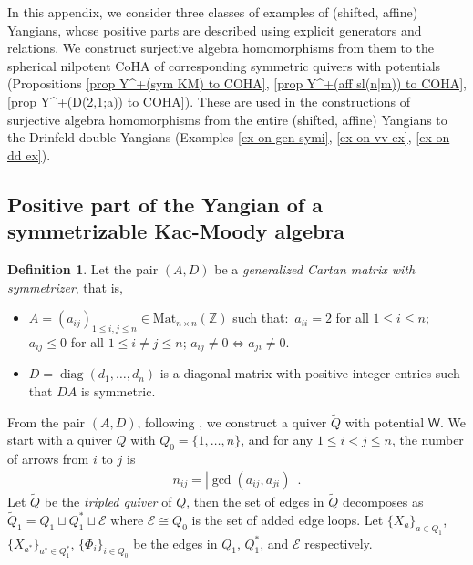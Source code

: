 \documentclass[10pt]{amsart}
\theoremstyle{definition}
\newtheorem{Definition}[Theorem]{Definition}
\numberwithin{equation}{section}
\newcommand{\bZ}{\mathbb{Z}}
\newcommand{\sW}{\mathsf{W}}
\newcommand{\diag}{\operatorname{diag}}
\begin{document}
In this appendix, we consider three classes of examples of (shifted, affine) Yangians, 
whose positive parts are described using explicit generators and relations.  
We construct surjective algebra homomorphisms from them to the 
spherical nilpotent CoHA of corresponding symmetric quivers with potentials (Propositions \ref{prop Y^+(sym KM) to COHA}, \ref{prop Y^+(aff sl(n|m)) to COHA}, \ref{prop Y^+(D(2,1;a)) to COHA}). These are used in the constructions of surjective algebra homomorphisms from 
the entire (shifted, affine) Yangians to the Drinfeld double Yangians (Examples \ref{ex on gen symi}, \ref{ex on vv ex}, \ref{ex on dd ex}).

\subsection{Positive part of the Yangian of a symmetrizable Kac-Moody algebra}\label{sec Y(sym KM)} 

\begin{Definition}
Let the pair $(A,D)$ be a \textit{generalized Cartan matrix with symmetrizer}, that is,
\begin{itemize}
    \item $A=(a_{ij})_{1\leqslant i,j\leqslant n}\in \mathrm{Mat}_{n\times n}(\bZ)$ such that:~$a_{ii}=2$ for all $1\leqslant i\leqslant n$; $a_{ij}\leqslant 0$ for all $1\leqslant i\neq j\leqslant n$; $a_{ij}\neq 0\Leftrightarrow a_{ji}\neq 0$.
    \item $D=\diag(d_1,\ldots,d_n)$ is a diagonal matrix with positive integer entries such that $DA$ is symmetric.
\end{itemize}
\end{Definition}
From the pair $(A,D)$, following \cite{GLS}, we construct a quiver $\widetilde{Q}$ with potential $\sW$. We start with a quiver $Q$ with $Q_0=\{1,\ldots,n\}$, and for any $1\leqslant i<j\leqslant n$, the number of arrows from $i$ to $j$ is 
\begin{align*}
    n_{ij}=|\gcd(a_{ij},a_{ji})|\:.
\end{align*}
Let $\widetilde{Q}$ be the \textit{tripled quiver} of $Q$, then the set of edges in $\widetilde{Q}$ decomposes as $\widetilde{Q}_1=Q_1\sqcup Q_1^*\sqcup \mathcal E$ where $\mathcal E\cong Q_0$ is the set of added edge loops. Let $\{X_a\}_{a\in Q_1}$, $\{X_{a^*}\}_{a^*\in Q^*_1}$, $\{\Phi_i\}_{i\in Q_0}$ be the edges in $Q_1$, $Q_1^*$, and $\mathcal E$ respectively. 
\end{document}
